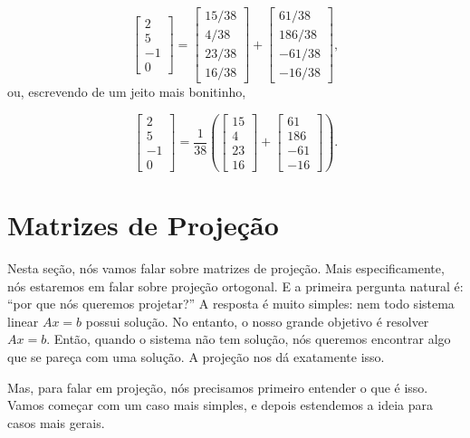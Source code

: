\begin{Example}
	$$
	\begin{bmatrix}
		2 \\
		5 \\
		-1 \\
		0
	\end{bmatrix} = \begin{bmatrix}
		15/38 \\
		4/38 \\
		23/38 \\
		16/38
	\end{bmatrix} + \begin{bmatrix}
		61/38 \\
		186/38 \\
		-61/38 \\
		-16/38
	\end{bmatrix},
	$$
	ou, escrevendo de um jeito mais bonitinho,
	
	$$
	\begin{bmatrix}
		2 \\
		5 \\
		-1 \\
		0
	\end{bmatrix} = \dfrac{1}{38}\left(\begin{bmatrix}
		15 \\
		4 \\
		23 \\
		16
	\end{bmatrix} + \begin{bmatrix}
		61 \\
		186 \\
		-61 \\
		-16
	\end{bmatrix}\right).
	$$
\end{Example}

\section{Matrizes de Projeção}

Nesta seção, nós vamos falar sobre matrizes de projeção. Mais especificamente, nós estaremos em falar sobre projeção ortogonal. E a primeira pergunta natural é: ``por que nós queremos projetar?'' A resposta é muito simples: nem todo sistema linear $Ax = b$ possui solução. No entanto, o nosso grande objetivo é resolver $Ax = b$. Então, quando o sistema não tem solução, nós queremos encontrar algo que se pareça com uma solução. A projeção nos dá exatamente isso.

Mas, para falar em projeção, nós precisamos primeiro entender o que é isso. Vamos começar com um caso mais simples, e depois estendemos a ideia para casos mais gerais.

